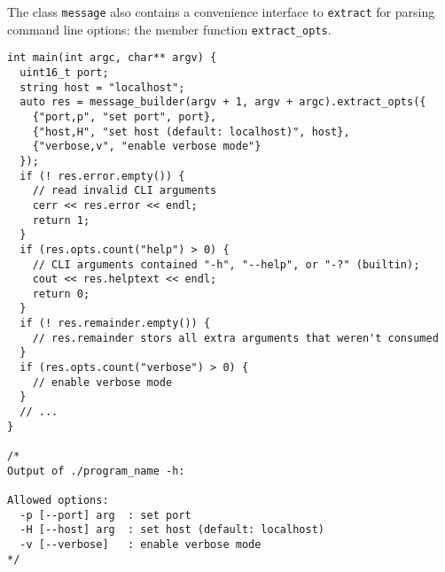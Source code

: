 The class \lstinline^message^ also contains a convenience interface to \lstinline^extract^ for parsing command line options: the member function \lstinline^extract_opts^.

\begin{lstlisting}
int main(int argc, char** argv) {
  uint16_t port;
  string host = "localhost";
  auto res = message_builder(argv + 1, argv + argc).extract_opts({
    {"port,p", "set port", port},
    {"host,H", "set host (default: localhost)", host},
    {"verbose,v", "enable verbose mode"}
  });
  if (! res.error.empty()) {
    // read invalid CLI arguments
    cerr << res.error << endl;
    return 1;
  }
  if (res.opts.count("help") > 0) {
    // CLI arguments contained "-h", "--help", or "-?" (builtin);
    cout << res.helptext << endl;
    return 0;
  }
  if (! res.remainder.empty()) {
    // res.remainder stors all extra arguments that weren't consumed
  }
  if (res.opts.count("verbose") > 0) {
    // enable verbose mode
  }
  // ...
}

/*
Output of ./program_name -h:

Allowed options:
  -p [--port] arg  : set port
  -H [--host] arg  : set host (default: localhost)
  -v [--verbose]   : enable verbose mode
*/
\end{lstlisting}
